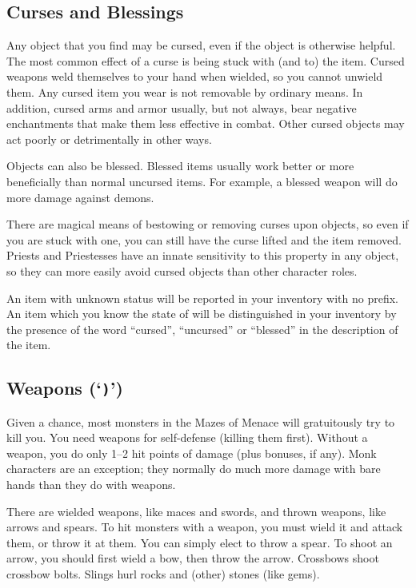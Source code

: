 \subsection*{Curses and Blessings}

Any object that you find may be cursed, even if the object is
otherwise helpful.  The most common effect of a curse is being stuck
with (and to) the item.  Cursed weapons weld themselves to your hand
when wielded, so you cannot unwield them.  Any cursed item you wear
is not removable by ordinary means.  In addition, cursed arms and armor
usually, but not always, bear negative enchantments that make them
less effective in combat.  Other cursed objects may act poorly or
detrimentally in other ways.

Objects can also be blessed.  Blessed items usually work better or
more beneficially than normal uncursed items.  For example, a blessed
weapon will do more damage against demons.

There are magical means of bestowing or removing curses upon objects,
so even if you are stuck with one, you can still have the curse
lifted and the item removed.  Priests and Priestesses have an innate
sensitivity to this property in any object, so they can more easily avoid
cursed objects than other character roles.

An item with unknown status will be reported in your inventory with no prefix.
An item which you know the state of will be distinguished in your inventory
by the presence of the word ``cursed'', ``uncursed'' or ``blessed'' in the
description of the item.

\subsection*{Weapons (`{\tt )}')}

Given a chance, most monsters in the Mazes of Menace will gratuitously try to
kill you.  You need weapons for self-defense (killing them first).  Without a
weapon, you do only 1--2 hit points of damage (plus bonuses, if any).
Monk characters are an exception; they normally do much more damage with
bare hands than they do with weapons.

There are wielded weapons, like maces and swords, and thrown weapons,
like arrows and spears.  To hit monsters with a weapon, you must wield it and
attack them, or throw it at them.  You can simply elect to throw a spear.
To shoot an arrow, you should first wield a bow, then throw the arrow.
Crossbows shoot crossbow bolts.  Slings hurl rocks and (other) stones
(like gems).

